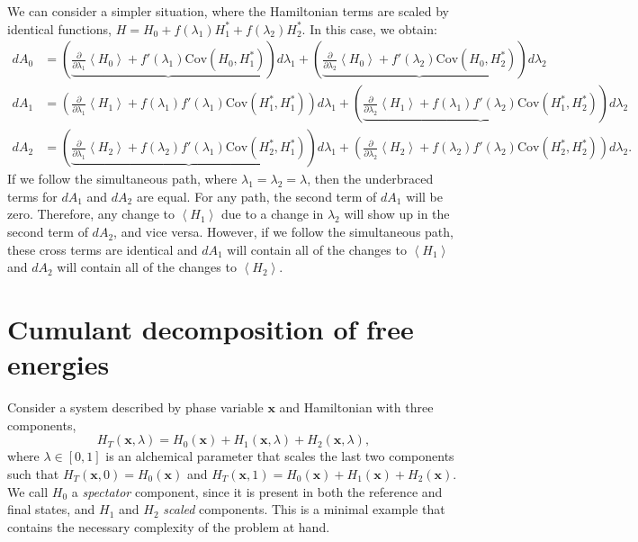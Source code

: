 \documentclass[%
 preprint,
 amsmath,amssymb,
 aps,
]{revtex4-1}
\renewcommand{\vec}[1]{{\bm{#1}}}
\begin{document}
We can consider a simpler situation, where the Hamiltonian terms are scaled by identical functions, $H = H_0 + f(\lambda_1)H_1^* + f(\lambda_2)H_2^*$. In this case, we obtain:
\begin{align}
dA_0 &=
\left( \underbrace{
	\frac{\partial}{\partial \lambda_1}
    	\left<H_0\right> +
    	f'(\lambda_1)\mathrm{Cov}\left(H_0,H_1^*\right)
} \right) d\lambda_1 +
\left( \underbrace{
	\frac{\partial}{\partial \lambda_2}
    	\left<H_0\right> +
    	f'(\lambda_2)\mathrm{Cov}\left(H_0,H_2^*\right)
} \right) d\lambda_2 \\
dA_1 &=
\left(
	\frac{\partial}{\partial \lambda_1}
    	\left<H_1\right> +
    	f(\lambda_1)f'(\lambda_1)\mathrm{Cov}(H_1^*,H_1^*)
\right) d\lambda_1 +
\left(\underbrace{
	\frac{\partial}{\partial \lambda_2}
    	\left<H_1\right> +
    	f(\lambda_1)f'(\lambda_2)\mathrm{Cov}(H_1^*,H_2^*)
}\right) d\lambda_2 \\
dA_2 &=
\left(\underbrace{
	\frac{\partial}{\partial \lambda_1}
    	\left<H_2\right> +
    	f(\lambda_2)f'(\lambda_1)\mathrm{Cov}(H_2^*,H_1^*)
}\right) d\lambda_1 +
\left(
	\frac{\partial}{\partial \lambda_2}
    	\left<H_2\right> +
    	f(\lambda_2)f'(\lambda_2)\mathrm{Cov}(H_2^*, H_2^*)
\right) d\lambda_2.
\end{align}
If we follow the simultaneous path, where $\lambda_1 = \lambda_2 = \lambda$, then the underbraced terms for $dA_1$ and $dA_2$ are equal. For any path, the second term of $dA_1$ will be zero. Therefore, any change to $\left< H_1 \right>$ due to a change in $\lambda_2$ will show up in the second term of $dA_2$, and vice versa. However, if we follow the simultaneous path, these cross terms are identical and $dA_1$ will contain all of the changes to $\left< H_1 \right>$ and $dA_2$ will contain all of the changes to $\left< H_2 \right>$.


\section{Cumulant decomposition of free energies}
\label{S:CumulantGeneral}

Consider a system described by phase variable $\vec{x}$ and Hamiltonian with three components,
\begin{equation}
H_T(\vec{x},\lambda) = H_0(\vec{x}) + H_1(\vec{x},\lambda) + H_2(\vec{x},\lambda),
\end{equation}
where $\lambda \in [ 0, 1] $ is an alchemical parameter that scales the last two components such that 
$
H_T(\vec{x},0) = H_0 (\vec{x})
$
and 
$
H_T(\vec{x},1) = H_0(\vec{x}) + H_1(\vec{x}) + H_2(\vec{x}).
$
We call $H_0$ a \emph{spectator} component, since it is present in both the reference and final states, and $H_1$ and $H_2$ \emph{scaled} components.  This is a minimal example that contains the necessary complexity of the problem at hand.
 
\end{document}
